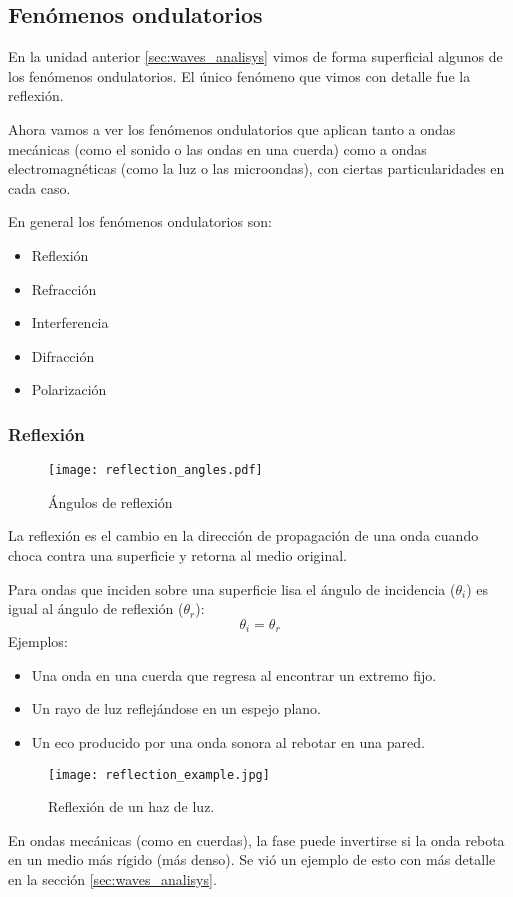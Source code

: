 \subsection{Fenómenos ondulatorios}

En la unidad anterior \ref{sec:waves_analisys} vimos de forma superficial algunos de los fenómenos ondulatorios. El único fenómeno que vimos con detalle fue la reflexión.

Ahora vamos a ver los fenómenos ondulatorios que aplican tanto a ondas mecánicas (como el sonido o las ondas en una cuerda) como a ondas electromagnéticas (como la luz o las microondas), con ciertas particularidades en cada caso.

En general los fenómenos ondulatorios son:

\begin{itemize}
  \item Reflexión
  \item Refracción
  \item Interferencia
  \item Difracción
  \item Polarización
\end{itemize}

\subsubsection{Reflexión}

\begin{wrapfigure}{r}{0.24\textwidth}
  \centering
  \texttt{[image: reflection\_angles.pdf]}
  \caption{Ángulos de reflexión}
  \label{fig:reflection_angles}
\end{wrapfigure}
La reflexión es el cambio en la dirección de propagación de una onda cuando choca contra una superficie y retorna al medio original.

Para ondas que inciden sobre una superficie lisa el ángulo de incidencia (\(\theta_i\)) es igual al ángulo de reflexión (\(\theta_r\)):
\[
  \theta_i = \theta_r
\]
Ejemplos:
\begin{itemize}
  \item Una onda en una cuerda que regresa al encontrar un extremo fijo.
  \item Un rayo de luz reflejándose en un espejo plano.
  \item Un eco producido por una onda sonora al rebotar en una pared.
\end{itemize}

\begin{wrapfigure}{l}{0.3\textwidth}
  \centering
  \texttt{[image: reflection\_example.jpg]}
  \caption{Reflexión de un haz de luz.}
  \label{fig:reflexion}
\end{wrapfigure}
En ondas mecánicas (como en cuerdas), la fase puede invertirse si la onda rebota en un medio más rígido (más denso). Se vió un ejemplo de esto con más detalle en la sección \ref{sec:waves_analisys}. 

